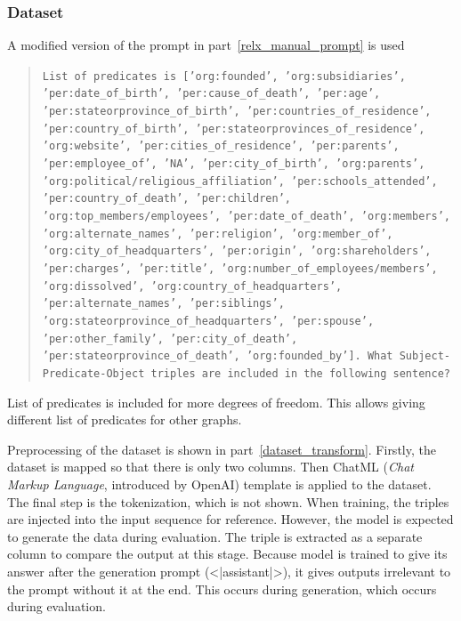 \documentclass{article}
\begin{document}
\subsubsection{Dataset}
A modified version of the prompt in part~\ref{relx_manual_prompt} is used
\begin{quote}
    \texttt{List of predicates is ['org:founded', 'org:subsidiaries', 'per:date\_of\_birth', 'per:cause\_of\_death', 'per:age', 'per:stateorprovince\_of\_birth', 'per:countries\_of\_residence', 'per:country\_of\_birth', 'per:stateorprovinces\_of\_residence', 'org:website', 'per:cities\_of\_residence', 'per:parents', 'per:employee\_of', 'NA', 'per:city\_of\_birth', 'org:parents', 'org:political/religious\_affiliation', 'per:schools\_attended', 'per:country\_of\_death', 'per:children', 'org:top\_members/employees', 'per:date\_of\_death', 'org:members', 'org:alternate\_names', 'per:religion', 'org:member\_of', 'org:city\_of\_headquarters', 'per:origin', 'org:shareholders', 'per:charges', 'per:title', 'org:number\_of\_employees/members', 'org:dissolved', 'org:country\_of\_headquarters', 'per:alternate\_names', 'per:siblings', 'org:stateorprovince\_of\_headquarters', 'per:spouse', 'per:other\_family', 'per:city\_of\_death', 'per:stateorprovince\_of\_death', 'org:founded\_by']. What Subject-Predicate-Object triples are included in the following sentence?}
\end{quote}
List of predicates is included for more degrees of freedom. This allows giving different list of predicates for other graphs. 

Preprocessing of the dataset is shown in part~\ref{dataset_transform}. Firstly, the dataset is mapped so that there is only two columns. Then ChatML (\textit{Chat Markup Language}, introduced by OpenAI) template is applied to the dataset. The final step is the tokenization, which is not shown. When training, the triples are injected into the input sequence for reference. However, the model is expected to generate the data during evaluation. The triple is extracted as a separate column to compare the output at this stage. Because model is trained to give its answer after the generation prompt (<|assistant|>), it gives outputs irrelevant to the prompt without it at the end. This occurs during generation, which occurs during evaluation.
\end{document}
